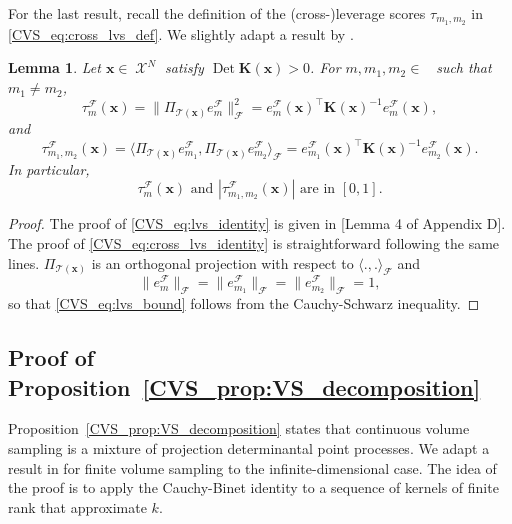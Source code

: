 \documentclass[twoside,11pt]{book}
\newtheorem{lemma}{Lemma}
\numberwithin{theorem}{chapter}
\numberwithin{definition}{chapter}
\numberwithin{proposition}{chapter}
\numberwithin{corollary}{chapter}
\numberwithin{example}{chapter}
\numberwithin{lemma}{chapter}
\numberwithin{assumption}{chapter}
\numberwithin{equation}{chapter}
\numberwithin{figure}{chapter}
\DeclareMathOperator{\Det}{Det}
\DeclareMathOperator{\Tran}{\intercal}
\DeclareMathOperator{\F}{\mathcal{F}}
\DeclareMathOperator{\X}{\mathcal{X}}
\DeclareMathOperator{\Ns}{\mathbb{N}^{*}}
\newcommand{\rb}[1]{\textcolor{magenta}{#1}}
\begin{document}
For the last result, recall the definition of the (cross-)leverage scores $\tau_{m_{1},m_{2}}$ in \eqref{CVS_eq:cross_lvs_def}. We slightly adapt a result by \cite{BeBaCh19} .
\begin{lemma}\label{CVS_lemma:lvs_identities}
Let $\bm{x} \in \X^{N}$ satisfy $\Det \bm{K}(\bm{x}) > 0$. For $m, m_{1}, m_{2} \in \Ns$ such that $m_{1} \neq m_{2}$,
\begin{equation}\label{CVS_eq:lvs_identity}
\tau_{m}^{\F}(\bm{x}) = \|\Pi_{\mathcal{T}(\bm{x})}e_{m}^{\F}\|_{\F}^{2} = e_{m}^{\F}(\bm{x})^{\Tran} \bm{K}(\bm{x})^{-1} e_{m}^{\F}(\bm{x}),
\end{equation}
and
\begin{equation}\label{CVS_eq:cross_lvs_identity}
\tau_{m_{1},m_{2}}^{\F}(\bm{x}) = \langle \Pi_{\mathcal{T}(\bm{x})}e_{m_{1}}^{\F}, \Pi_{\mathcal{T}(\bm{x})}e_{m_{2}}^{\F} \rangle_{\F} = e_{m_1}^{\F}(\bm{x})^{\Tran} \bm{K}(\bm{x})^{-1} e_{m_2}^{\F}(\bm{x}).
\end{equation}
In particular,
\begin{equation}
  \label{CVS_eq:lvs_bound}
  \tau_{m}^{\F}(\bm{x})\text{  and  }|\tau_{m_{1},m_{2}}^{\F}(\bm{x})|\text{  are in  }[0,1].
\end{equation}
\end{lemma}
\begin{proof}
The proof of \eqref{CVS_eq:lvs_identity} is given in \parencite{BeBaCh19}[Lemma 4 of Appendix D]. The proof of \eqref{CVS_eq:cross_lvs_identity} is straightforward following the same lines. $\Pi_{\mathcal{T}(\bm{x})}$ is an orthogonal projection with respect to $\langle .,. \rangle_{\F}$ and
\begin{equation}
\|e_{m}^{\F}\|_{\F} = \|e_{m_{1}}^{\F}\|_{\F} = \|e_{m_{2}}^{\F}\|_{\F} = 1,
\end{equation}
so that \eqref{CVS_eq:lvs_bound} follows from the Cauchy-Schwarz inequality.
\end{proof}


 \subsection{Proof of Proposition~\ref{CVS_prop:VS_decomposition}}\label{CVS_sec:proof_VS_decomposition}

Proposition~\ref{CVS_prop:VS_decomposition} states that continuous volume sampling is a mixture of projection determinantal point processes. We adapt a result in \citep[Chapter 5]{KuTa12} for finite volume sampling to the infinite-dimensional case. The idea of the proof is to apply the Cauchy-Binet identity to a sequence of kernels of finite rank that approximate $k$.
\end{document}
